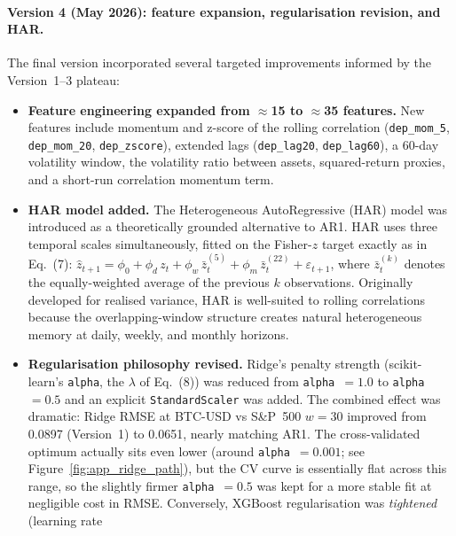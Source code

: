 \paragraph{Version 4 (May 2026): feature expansion, regularisation revision, and HAR.}
The final version incorporated several targeted improvements informed by the
Version~1--3 plateau:

\begin{itemize}
    \item \textbf{Feature engineering expanded from $\approx$15 to $\approx$35 features.}
          New features include momentum and z-score of the rolling correlation
          (\texttt{dep\_mom\_5}, \texttt{dep\_mom\_20}, \texttt{dep\_zscore}),
          extended lags (\texttt{dep\_lag20}, \texttt{dep\_lag60}), a 60-day volatility
          window, the volatility ratio between assets, squared-return proxies, and a
          short-run correlation momentum term.
    \item \textbf{HAR model added.}
          The Heterogeneous AutoRegressive (HAR) model
          \cite{corsi2009har}
          was introduced as a theoretically grounded alternative to AR1.
          HAR uses three temporal scales simultaneously, fitted on the Fisher-$z$
          target exactly as in Eq.~(7):
          $\hat{z}_{t+1} = \phi_0 + \phi_d\,z_t + \phi_w\,\bar{z}^{(5)}_t + \phi_m\,\bar{z}^{(22)}_t + \varepsilon_{t+1}$,
          where $\bar{z}^{(k)}_t$ denotes the equally-weighted average of the previous
          $k$ observations.
          Originally developed for realised variance, HAR is well-suited to rolling
          correlations because the overlapping-window structure creates natural
          heterogeneous memory at daily, weekly, and monthly horizons.
    \item \textbf{Regularisation philosophy revised.}
          Ridge's penalty strength (scikit-learn's \texttt{alpha}, the $\lambda$ of
          Eq.~(8)) was reduced from \texttt{alpha}~$= 1.0$ to \texttt{alpha}~$= 0.5$
          and an explicit \texttt{StandardScaler} was added.
          The combined effect was dramatic: Ridge RMSE at BTC-USD vs S\&P~500 $w = 30$
          improved from 0.0897 (Version~1) to 0.0651, nearly matching AR1.
          The cross-validated optimum actually sits even lower (around
          \texttt{alpha}~$= 0.001$; see Figure~\ref{fig:app_ridge_path}), but the CV
          curve is essentially flat across this range, so the slightly firmer
          \texttt{alpha}~$= 0.5$ was kept for a more stable fit at negligible cost in RMSE.
          Conversely, XGBoost regularisation was \emph{tightened} (learning rate

\end{itemize}
